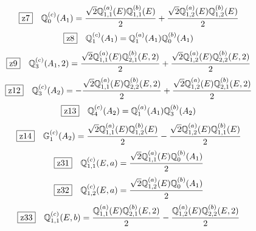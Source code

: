 \documentclass[fleqn,10pt,landscape]{jsarticle}
\begin{document}
\begin{dmath*}
\hspace*{3mm}\fbox{z7}\quad \mathbb{Q}_{0}^{(c)}(A_{1})=\frac{\sqrt{2} \mathbb{Q}_{1,1}^{(a)}(E) \mathbb{Q}_{1,1}^{(b)}(E)}{2} + \frac{\sqrt{2} \mathbb{Q}_{1,2}^{(a)}(E) \mathbb{Q}_{1,2}^{(b)}(E)}{2}
\end{dmath*}
\begin{dmath*}
\hspace*{3mm}\fbox{z8}\quad \mathbb{Q}_{1}^{(c)}(A_{1})=\mathbb{Q}_{1}^{(a)}(A_{1}) \mathbb{Q}_{0}^{(b)}(A_{1})
\end{dmath*}
\begin{dmath*}
\hspace*{3mm}\fbox{z9}\quad \mathbb{Q}_{3}^{(c)}(A_{1},2)=\frac{\sqrt{2} \mathbb{Q}_{1,1}^{(a)}(E) \mathbb{Q}_{2,1}^{(b)}(E,2)}{2} + \frac{\sqrt{2} \mathbb{Q}_{1,2}^{(a)}(E) \mathbb{Q}_{2,2}^{(b)}(E,2)}{2}
\end{dmath*}
\begin{dmath*}
\hspace*{3mm}\fbox{z12}\quad \mathbb{Q}_{3}^{(c)}(A_{2})=- \frac{\sqrt{2} \mathbb{Q}_{1,1}^{(a)}(E) \mathbb{Q}_{2,2}^{(b)}(E,2)}{2} + \frac{\sqrt{2} \mathbb{Q}_{1,2}^{(a)}(E) \mathbb{Q}_{2,1}^{(b)}(E,2)}{2}
\end{dmath*}
\begin{dmath*}
\hspace*{3mm}\fbox{z13}\quad \mathbb{Q}_{4}^{(c)}(A_{2})=\mathbb{Q}_{1}^{(a)}(A_{1}) \mathbb{Q}_{3}^{(b)}(A_{2})
\end{dmath*}
\begin{dmath*}
\hspace*{3mm}\fbox{z14}\quad \mathbb{G}_{1}^{(c)}(A_{2})=\frac{\sqrt{2} \mathbb{Q}_{1,1}^{(a)}(E) \mathbb{Q}_{1,2}^{(b)}(E)}{2} - \frac{\sqrt{2} \mathbb{Q}_{1,2}^{(a)}(E) \mathbb{Q}_{1,1}^{(b)}(E)}{2}
\end{dmath*}
\begin{dmath*}
\hspace*{3mm}\fbox{z31}\quad \mathbb{Q}_{1,1}^{(c)}(E,a)=\frac{\sqrt{2} \mathbb{Q}_{1,1}^{(a)}(E) \mathbb{Q}_{0}^{(b)}(A_{1})}{2}
\end{dmath*}
\begin{dmath*}
\hspace*{3mm}\fbox{z32}\quad \mathbb{Q}_{1,2}^{(c)}(E,a)=\frac{\sqrt{2} \mathbb{Q}_{1,2}^{(a)}(E) \mathbb{Q}_{0}^{(b)}(A_{1})}{2}
\end{dmath*}
\begin{dmath*}
\hspace*{3mm}\fbox{z33}\quad \mathbb{Q}_{1,1}^{(c)}(E,b)=\frac{\mathbb{Q}_{1,1}^{(a)}(E) \mathbb{Q}_{2,1}^{(b)}(E,2)}{2} - \frac{\mathbb{Q}_{1,2}^{(a)}(E) \mathbb{Q}_{2,2}^{(b)}(E,2)}{2}
\end{dmath*}
\end{document}
